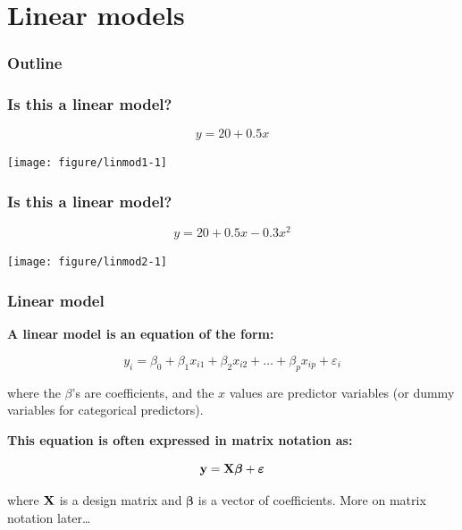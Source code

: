 \documentclass[color=usenames,dvipsnames]{beamer}\usepackage[]{graphicx}\usepackage[]{color}
\begin{document}
\section{Linear models}



\begin{frame}
  \frametitle{Outline}
  \LARGE
\end{frame}



\begin{frame}[fragile]
  \frametitle{Is this a linear model?}
\[
y = 20 + 0.5 x
\]

\begin{center}
  \texttt{[image: figure/linmod1-1]}
\end{center}
\end{frame}




\begin{frame}[fragile]
  \frametitle{Is this a linear model?}
\[
y = 20 + 0.5 x - 0.3 x^2
\]

\begin{center}
  \texttt{[image: figure/linmod2-1]}
\end{center}
\end{frame}





\begin{frame}
  \frametitle{Linear model}
{\bf A linear model is an equation of the form:}

\[
y_i = \beta_0 + \beta_1 x_{i1} + \beta_2 x_{i2} + \ldots + \beta_p x_{ip} + \varepsilon_i
\]

where the $\beta$'s are coefficients, and the $x$ values are predictor
variables (or dummy variables for categorical predictors).
\pause

\vspace{0.5cm}

{\bf This equation is often expressed in matrix notation as:}

\[
{\bf y} = {\bf X} {\bm{\beta}} + {\bm \varepsilon}
\]

where $\bf X$ is a \alert{design matrix} and $\bm{\beta}$ is a
vector of coefficients. \pause More on matrix notation later\dots
\end{frame}


\end{document}
